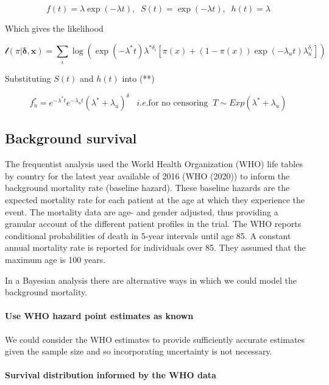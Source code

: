 \documentclass[
]{article}
\begin{document}
\[
f(t) = \lambda \exp(-\lambda t), \;\; S(t) = \exp(-\lambda t), \;\; h(t) = \lambda
\]

Which gives the likelihood

\[
\mathcal{l}(\pi | \boldsymbol{\delta}, \boldsymbol{x}) =
 \sum_i \log(\exp(-\lambda^* t) \lambda^{* \delta_i}[\pi(x) +
   (1 − \pi(x)) \exp(-\lambda_u t) \lambda_u^{\delta_i}])
\]

Substituting \(S(t)\) and \(h(t)\) into (**)

\[
f^*_u = e^{-\lambda^* t} e^{-\lambda_u t} (\lambda^* + \lambda_u)^{\delta} \;\;\; i.e. \mbox{for no censoring} \;\; T \sim Exp(\lambda^* + \lambda_u)
\]

\hypertarget{background-survival}{%
\subsection{Background survival}\label{background-survival}}

The frequentist analysis used the World Health Organization (WHO) life
tables by country for the latest year available of 2016 (WHO (2020)) to
inform the background mortality rate (baseline hazard). These baseline
hazards are the expected mortality rate for each patient at the age at
which they experience the event. The mortality data are age- and gender
adjusted, thus providing a granular account of the different patient
profiles in the trial. The WHO reports conditional probabilities of
death in 5-year intervals until age 85. A constant annual mortality rate
is reported for individuals over 85. They assumed that the maximum age
is 100 years.

In a Bayesian analysis there are alternative ways in which we could
model the background mortality.

\hypertarget{use-who-hazard-point-estimates-as-known}{%
\paragraph{Use WHO hazard point estimates as
known}\label{use-who-hazard-point-estimates-as-known}}

We could consider the WHO estimates to provide sufficiently accurate
estimates given the sample size and so incorporating uncertainty is not
necessary.

\hypertarget{survival-distribution-informed-by-the-who-data}{%
\paragraph{Survival distribution informed by the WHO
data}\label{survival-distribution-informed-by-the-who-data}}
\end{document}
